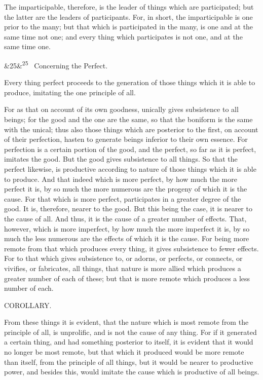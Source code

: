\documentclass[12pt]{article}
\newcommand{\para}[1][]{\par\noindent\ifx&#1&\else\textsuperscript{\footnotesize #1}~\fi}
\begin{document}
The imparticipable, therefore, is the leader of things which are participated; but the latter are the leaders of participants. For, in short, the imparticipable is one prior to the many; but that which is participated in the many, is one and at the same time not one; and every thing which participates is not one, and at the same time one.

\para[25] Concerning the Perfect.

Every thing perfect proceeds to the generation of those things which it is able to produce, imitating the one principle of all.

For as that on account of its own goodness, unically gives subsistence to all beings; for the good and the one are the same, so that the boniform is the same with the unical; thus also those things which are posterior to the first, on account of their perfection, hasten to generate beings inferior to their own essence. For perfection is a certain portion of the good, and the perfect, so far as it is perfect, imitates the good. But the good gives subsistence to all things. So that the perfect likewise, is productive according to nature of those things which it is able to produce. And that indeed which is more perfect, by how much the more perfect it is, by so much the more numerous are the progeny of which it is the cause. For that which is more perfect, participates in a greater degree of the good. It is, therefore, nearer to the good. But this being the case, it is nearer to the cause of all. And thus, it is the cause of a greater number of effects. That, however, which is more imperfect, by how much the more imperfect it is, by so much the less numerous are the effects of which it is the cause. For being more remote from that which produces every thing, it gives subsistence to fewer effects. For to that which gives subsistence to, or adorns, or perfects, or connects, or vivifies, or fabricates, all things, that nature is more allied which produces a greater number of each of these; but that is more remote which produces a less number of each.

COROLLARY.

From these things it is evident, that the nature which is most remote from the principle of all, is unprolific, and is not the cause of any thing. For if it generated a certain thing, and had something posterior to itself, it is evident that it would no longer be most remote, but that which it produced would be more remote than itself, from the principle of all things, but it would be nearer to productive power, and besides this, would imitate the cause which is productive of all beings.
\end{document}
